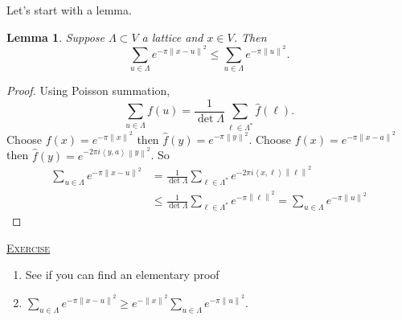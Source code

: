 \documentclass{report}
\newcommand{\inner}[2]{\left\langle #1, #2\right\rangle}
\newcommand{\norm}[1]{\left\| #1 \right\|}
\newcommand{\fancyem}[1]{\underline{\textsc{#1}}}
\newtheorem{lemma}{Lemma}[section]
\theoremstyle{definition}
\theoremstyle{remark}
\numberwithin{equation}{section}
\begin{document}
Let's start with a lemma.
\begin{lemma}
    Suppose $\Lambda \subset V$ a lattice and $x \in V$. Then \[\sum_{u \in \Lambda} e^{-\pi\norm{x - u}^2} \leq \sum_{u \in \Lambda} e^{-\pi\norm{u}^2}.\]
\end{lemma}
\begin{proof}
    Using Poisson summation, \[
        \sum_{u \in \Lambda} f(u) = \frac{1}{\det \Lambda} \sum_{\ell \in \Lambda^*}\widehat{f}(\ell).
    \]
    Choose $f(x) = e^{-\pi\norm{x}^2}$ then $\widehat{f}(y) = e^{-\pi\norm{y}^2}$.
    Choose $f(x) = e^{-\pi\norm{x - a}^2}$ then $\widehat{f}(y) = e^{-2\pi i \inner{y}{a}\norm{y}^2}$.
    So \begin{align*}
        \sum_{u \in \Lambda} e^{-\pi\norm{x - u}^2} & = \frac{1}{\det \Lambda} \sum_{\ell \in \Lambda^*}e^{-2\pi i \inner{x}{\ell}\norm{\ell}^2} \\
        & \leq \frac{1}{\det\Lambda} \sum_{\ell \in \Lambda^*} e^{-\pi\norm{\ell}^2} = \sum_{u \in \Lambda}e^{-\pi\norm{u}^2}
    \end{align*}
\end{proof}

\fancyem{Exercise} \begin{enumerate}
    \item See if you can find an elementary proof
    \item $\displaystyle\sum_{u \in \Lambda} e^{-\pi\norm{x - u}^2} \geq e^{-\norm{x}^2}\sum_{u \in \Lambda} e^{-\pi\norm{u}^2}$.
\end{enumerate}
\end{document}
